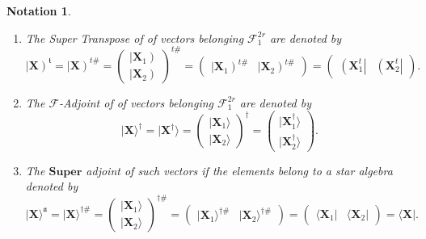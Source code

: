 \documentclass[aps, preprint]{revtex4}
\newtheorem{notation}[theorem]{Notation}
\begin{document}
\begin{notation}
\begin{enumerate}
\item The \emph{Super Transpose} of of vectors belonging
$\mathcal{F}_{1}^{2 r}$ are denoted by
\begin{equation}\left \vert \mathbf{X}\right )^{\mathfrak{t}} =\left \vert \mathbf{X}\right )^{t \#} =\left (\begin{array}{c}\left \vert \mathbf{X}_{1}\right ) \\
\left \vert \mathbf{X}_{2}\right )\end{array}\right )^{t \#} =\left (\begin{array}{cc}\left \vert \mathbf{X}_{1}\right )^{t \#} & \left \vert \mathbf{X}_{2}\right )^{t \#}\end{array}\right ) =\left (\begin{array}{cc}\left (\mathbf{X}_{1}^{t}\right \vert  & \left (\mathbf{X}_{2}^{t}\right \vert \end{array}\right )\text{.}
\end{equation}

\item The $\mathcal{F}$-\emph{Adjoint} of of vectors belonging $\mathcal{F}_{1}^{2 r}$ are denoted by
\begin{equation}\vert \mathbf{X} \rangle ^{ \dag } =\vert \mathbf{X}^{ \dag } \rangle  =\left (\begin{array}{c}\vert \mathbf{X}_{1} \rangle  \\
\vert \mathbf{X}_{2} \rangle \end{array}\right )^{ \dag } =\left (\begin{array}{c}\vert \mathbf{X}_{1}^{ \dag } \rangle  \\
\vert \mathbf{X}_{2}^{ \dag } \rangle \end{array}\right )\text{.}
\end{equation}

\item The $\mathbf{S} \mathbf{u} \mathbf{p} \mathbf{e} \mathbf{r}$ \emph{adjoint} of such vectors if the elements belong to a star algebra denoted by
\begin{equation}\vert \mathbf{X} \rangle ^{\mathfrak{a}} =\vert \mathbf{X} \rangle ^{ \dag \#} =\left (\begin{array}{c}\vert \mathbf{X}_{1} \rangle  \\
\vert \mathbf{X}_{2} \rangle \end{array}\right )^{ \dag \#} =\left (\begin{array}{cc}\vert \mathbf{X}_{1} \rangle ^{ \dag \#} & \vert \mathbf{X}_{2} \rangle ^{ \dag \#}\end{array}\right ) =\left (\begin{array}{cc} \langle \mathbf{X}_{1}\vert  &  \langle \mathbf{X}_{2}\vert \end{array}\right ) = \langle \mathbf{X}\vert \text{.}
\end{equation}\end{enumerate}




\end{notation}
\end{document}
